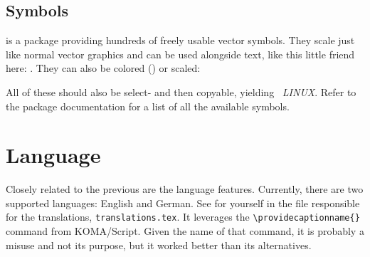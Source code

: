 \begin{table}\ContinuedFloat
\end{table}

\subsection{Symbols}

 is a package providing hundreds of freely usable vector
symbols.
They scale just like normal vector graphics and can be used alongside text, like
this little friend here: .
They can also be colored (\textcolor{mRed}{}) or scaled:
\begin{center}
\end{center}
All of these should also be select- and then copyable, yielding \
\emph{LINUX}.
Refer to the package documentation for a list of all the available symbols.

\section{Language}

Closely related to the previous  are the language features.
Currently, there are two supported languages: English and German.
See for yourself in the file responsible for the translations, \verb|translations.tex|.
It leverages the \verb|\providecaptionname{}| command from KOMA\-/Script.
Given the name of that command, it is probably a misuse and not its purpose, but
it worked better than its alternatives.

